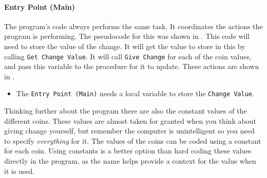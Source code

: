 
\paragraph{Entry Point (Main)} %
\label{par:entry_point_main_}
The program's code always performs the same task. It coordinates the actions the program is performing. The pseudocode for this was shown in . This code will need to store the value of the change. It will get the value to store in this by calling \texttt{Get Change Value}. It will call \texttt{Give Change} for each of the coin values, and pass this variable to the procedure for it to update. These actions are shown in .

\begin{itemize}
  \item The \texttt{Entry Point (Main)} needs a local variable to store the \texttt{Change Value}.
\end{itemize}

Thinking further about the program there are also the constant values of the different coins. These values are almost taken for granted when you think about giving change yourself, but remember the computer is unintelligent so you need to specify \emph{everything} for it. The values of the coins can be coded using a constant for each coin. Using constants is a better option than hard coding these values directly in the program, as the name helps provide a context for the value when it is used.


